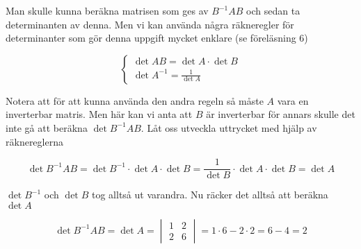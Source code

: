 \documentclass[../../main.tex]{subfiles}
\begin{document}
\begin{solution}{19}

Man skulle kunna beräkna matrisen som ges av $B^{-1}AB$ och sedan ta determinanten av denna. Men vi kan använda några räkneregler för determinanter som gör denna uppgift mycket enklare (se föreläsning 6)

$$
\begin{cases}
\det AB = \det A \cdot \det B\\
\det A^{-1} = \frac{1}{\det A} 
\end{cases}
$$

Notera att för att kunna använda den andra regeln så måste $A$ vara en inverterbar matris. Men här kan vi anta att $B$ är inverterbar för annars skulle det inte gå att beräkna $\det B^{-1}AB$. Låt oss utveckla uttrycket med hjälp av räknereglerna

$$
\det B^{-1}AB = \det B^{-1} \cdot \det A \cdot \det B = \frac{1}{\det B} \cdot \det A \cdot \det B = \det A
$$

$\det B^{-1}$ och $\det B$ tog alltså ut varandra. Nu räcker det alltså att beräkna $\det A$

$$
\det B^{-1}AB = \det A = 
\begin{vmatrix}
1 & 2\\
2 & 6
\end{vmatrix} =
1\cdot6 - 2\cdot2 = 6-4 = 2
$$


\end{solution}
\end{document}
